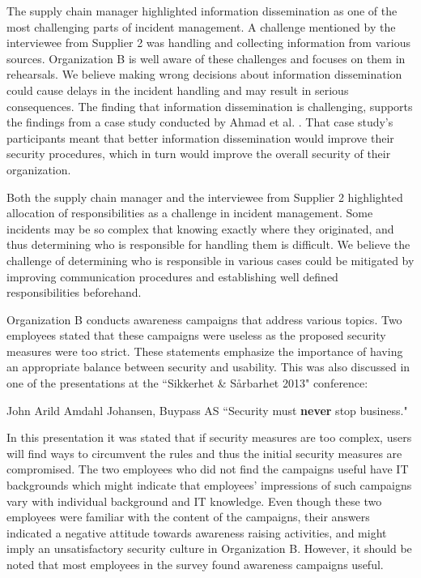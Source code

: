 The supply chain manager highlighted information dissemination as one of the most challenging parts of incident management. A challenge mentioned by the interviewee from Supplier 2 was handling and collecting information from various sources. Organization B is well aware of these challenges and focuses on them in rehearsals. We believe making wrong decisions about information dissemination could cause delays in the incident handling and may result in serious consequences. The finding that information dissemination is challenging, supports the findings from a case study conducted by Ahmad et al. \cite{ahmad2012incident}. That case study's participants meant that better information dissemination would improve their security procedures, which in turn would improve the overall security of their organization. 

Both the supply chain manager and the interviewee from Supplier 2 highlighted allocation of responsibilities as a challenge in incident management. Some incidents may be so complex that knowing exactly where they originated, and thus determining who is responsible for handling them is difficult. We believe the challenge of determining who is responsible in various cases could be mitigated by improving communication procedures and establishing well defined responsibilities beforehand.  

Organization B conducts awareness campaigns that address various topics. Two employees stated that these campaigns were useless as the proposed security measures were too strict. These statements emphasize the importance of having an appropriate balance between security and usability. This was also discussed in one of the presentations at the ``Sikkerhet \& S\aa rbarhet 2013" conference:

\begin{newquote}{John Arild Amdahl Johansen, Buypass AS}
``Security must \textbf{never} stop business."
\end{newquote}

In this presentation it was stated that if security measures are too complex, users will find ways to circumvent the rules and thus the initial security measures are compromised. The two employees who did not find the campaigns useful have IT backgrounds which might indicate that employees' impressions of such campaigns vary with individual background and IT knowledge. Even though these two employees were familiar with the content of the campaigns, their answers indicated a negative attitude towards awareness raising activities, and might imply an unsatisfactory security culture in Organization B. However, it should be noted that most employees in the survey found awareness campaigns useful.

